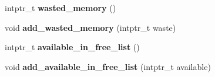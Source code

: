 \begin{DoxyCompactItemize}
\item 
intptr\+\_\+t {\bfseries wasted\+\_\+memory} ()\hypertarget{classv8_1_1internal_1_1_page_a0d5240346fba9146bbe1c4df491ea3b7}{}\label{classv8_1_1internal_1_1_page_a0d5240346fba9146bbe1c4df491ea3b7}

\item 
void {\bfseries add\+\_\+wasted\+\_\+memory} (intptr\+\_\+t waste)\hypertarget{classv8_1_1internal_1_1_page_ae1c20db884ddbb00309250ca96eab03e}{}\label{classv8_1_1internal_1_1_page_ae1c20db884ddbb00309250ca96eab03e}

\item 
intptr\+\_\+t {\bfseries available\+\_\+in\+\_\+free\+\_\+list} ()\hypertarget{classv8_1_1internal_1_1_page_a19a88265c005ebb3fb8745c3c98e4232}{}\label{classv8_1_1internal_1_1_page_a19a88265c005ebb3fb8745c3c98e4232}

\item 
void {\bfseries add\+\_\+available\+\_\+in\+\_\+free\+\_\+list} (intptr\+\_\+t available)\hypertarget{classv8_1_1internal_1_1_page_a9e6c6d8431e71b138d5e81a1f0a5e2b9}{}\label{classv8_1_1internal_1_1_page_a9e6c6d8431e71b138d5e81a1f0a5e2b9}

\end{DoxyCompactItemize}
